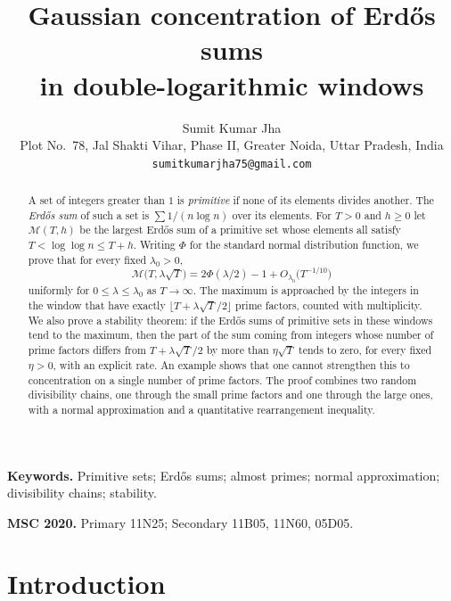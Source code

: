 \documentclass[11pt,a4paper]{article}
\title{Gaussian concentration of Erd\H{o}s sums\\ in double-logarithmic windows}
\author{Sumit Kumar Jha\\[2pt]
\small Plot No.~78, Jal Shakti Vihar, Phase II, Greater Noida, Uttar Pradesh, India\\
\small \texttt{sumitkumarjha75@gmail.com}}
\date{}
\numberwithin{equation}{section}
\theoremstyle{plain}
\theoremstyle{definition}
\theoremstyle{remark}
\newcommand{\cM}{\mathcal{M}}
\begin{document}
\maketitle

\begin{abstract}
A set of integers greater than $1$ is \emph{primitive} if none of its elements divides another. The \emph{Erd\H{o}s sum} of such a set is $\sum 1/(n\log n)$ over its elements. For $T>0$ and $h\ge0$ let $\cM(T,h)$ be the largest Erd\H{o}s sum of a primitive set whose elements all satisfy $T<\log\log n\le T+h$. Writing $\Phi$ for the standard normal distribution function, we prove that for every fixed $\lambda_0>0$,
\[
\cM\bigl(T,\lambda\sqrt T\bigr)=2\Phi(\lambda/2)-1+O_{\lambda_0}\bigl(T^{-1/10}\bigr)
\]
uniformly for $0\le\lambda\le\lambda_0$ as $T\to\infty$. The maximum is approached by the integers in the window that have exactly $\lfloor T+\lambda\sqrt T/2\rfloor$ prime factors, counted with multiplicity. We also prove a stability theorem: if the Erd\H{o}s sums of primitive sets in these windows tend to the maximum, then the part of the sum coming from integers whose number of prime factors differs from $T+\lambda\sqrt T/2$ by more than $\eta\sqrt T$ tends to zero, for every fixed $\eta>0$, with an explicit rate. An example shows that one cannot strengthen this to concentration on a single number of prime factors. The proof combines two random divisibility chains, one through the small prime factors and one through the large ones, with a normal approximation and a quantitative rearrangement inequality.
\end{abstract}

\noindent\textbf{Keywords.} Primitive sets; Erd\H{o}s sums; almost primes; normal approximation; divisibility chains; stability.

\noindent\textbf{MSC 2020.} Primary 11N25; Secondary 11B05, 11N60, 05D05.

\tableofcontents

\section{Introduction}\label{sec:intro}
\end{document}
